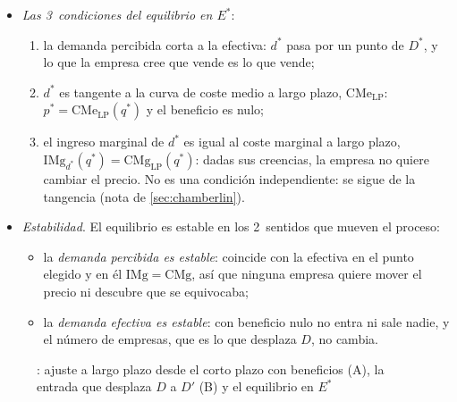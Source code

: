 \documentclass[11pt]{article}
\begin{document}
\begin{itemize}
\begin{enumerate}
  \end{enumerate}
\item \emph{Las 3~condiciones del equilibrio en $E^*$}:
  \begin{enumerate}
  \item la demanda percibida corta a la efectiva: $d^*$ pasa por un punto de $D^*$, y lo que la empresa cree que vende es lo que vende;
  \item $d^*$ es tangente a la curva de coste medio a largo plazo, $\mathrm{CMe}_{\mathrm{LP}}$: $p^*=\mathrm{CMe}_{\mathrm{LP}}(q^*)$ y el beneficio es nulo;
  \item el ingreso marginal de $d^*$ es igual al coste marginal a largo plazo, $\mathrm{IMg}_{d^*}(q^*)=\mathrm{CMg}_{\mathrm{LP}}(q^*)$: dadas sus creencias, la empresa no quiere cambiar el precio. No es una condición independiente: se sigue de la tangencia (nota de \ref{sec:chamberlin}).
  \end{enumerate}
\item \emph{Estabilidad}. El equilibrio es estable en los 2~sentidos que mueven el proceso:
  \begin{itemize}
  \item la \emph{demanda percibida es estable}: coincide con la efectiva en el punto elegido y en él $\mathrm{IMg}=\mathrm{CMg}$, así que ninguna empresa quiere mover el precio ni descubre que se equivocaba;
  \item la \emph{demanda efectiva es estable}: con beneficio nulo no entra ni sale nadie, y el número de empresas, que es lo que desplaza $D$, no cambia.
  \end{itemize}
\end{itemize}

\begin{figure}[H]
\centering
\caption{: ajuste a largo plazo desde el corto plazo con beneficios (A), la entrada que desplaza $D$ a $D'$ (B) y el equilibrio en $E^*$}\label{fig:chamberlin-ajuste}
\end{figure}
\end{document}
